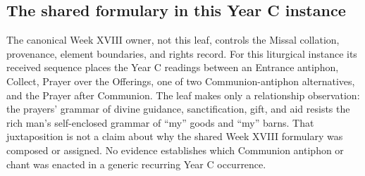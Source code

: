 \subsection*{The shared formulary in this Year C instance}
The canonical Week XVIII owner, not this leaf, controls the Missal collation,
provenance, element boundaries, and rights record. For this liturgical
instance its received sequence places the Year C readings between an Entrance
antiphon, Collect, Prayer over the Offerings, one of two Communion-antiphon
alternatives, and the Prayer after Communion. The leaf makes only a
relationship observation: the prayers' grammar of divine guidance,
sanctification, gift, and aid resists the rich man's self-enclosed grammar of
``my'' goods and ``my'' barns. That juxtaposition is not a claim about why the
shared Week XVIII formulary was composed or assigned. No evidence establishes
which Communion antiphon or chant was enacted in a generic recurring Year C
occurrence.
